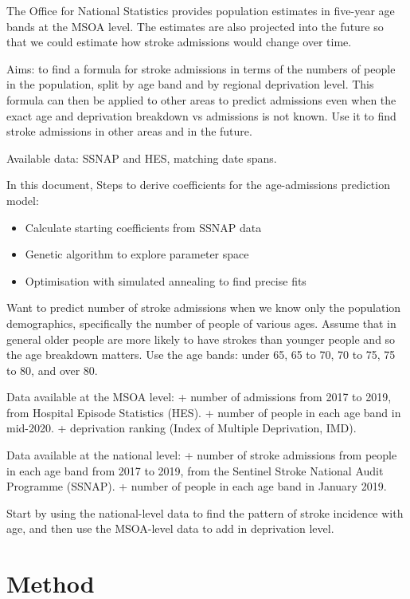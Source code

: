 \documentclass[12pt]{extarticle}
\begin{document}
The Office for National Statistics provides population estimates in five-year age bands at the MSOA level. The estimates are also projected into the future so that we could estimate how stroke admissions would change over time. 

Aims: to find a formula for stroke admissions in terms of the numbers of people in the population, split by age band and by regional deprivation level.
This formula can then be applied to other areas to predict admissions even when the exact age and deprivation breakdown vs admissions is not known.
Use it to find stroke admissions in other areas and in the future.

Available data: SSNAP and HES, matching date spans.

In this document,
Steps to derive coefficients for the age-admissions prediction model:

\begin{itemize}
    \item Calculate starting coefficients from SSNAP data
    \item Genetic algorithm to explore parameter space
    \item Optimisation with simulated annealing to find precise fits
\end{itemize}



Want to predict number of stroke admissions when we know only the population demographics, specifically the number of people of various ages. Assume that in general older people are more likely to have strokes than younger people and so the age breakdown matters. Use the age bands: under 65, 65 to 70, 70 to 75, 75 to 80, and over 80.

Data available at the MSOA level:
+ number of admissions from 2017 to 2019, from Hospital Episode Statistics (HES).
+ number of people in each age band in mid-2020.
+ deprivation ranking (Index of Multiple Deprivation, IMD).

Data available at the national level:
+ number of stroke admissions from people in each age band from 2017 to 2019, from the Sentinel Stroke National Audit Programme (SSNAP).
+ number of people in each age band in January 2019.

Start by using the national-level data to find the pattern of stroke incidence with age, and then use the MSOA-level data to add in deprivation level.


\section{Method}
\end{document}
